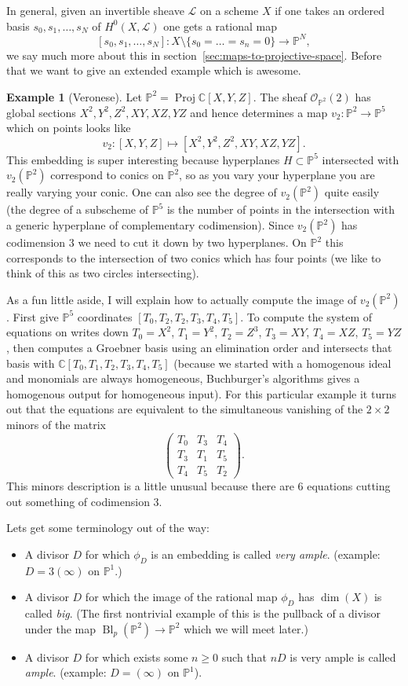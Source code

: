 \documentclass[12pt]{article}
\numberwithin{equation}{section}
\theoremstyle{definition}
\newtheorem{example}[theorem]{Example}
\theoremstyle{remark}
\newcommand{\CC}{\mathbb{C}}
\newcommand{\Ocal}{\mathcal{O}}
\newcommand{\PP}{\mathbb{P}}
\newcommand{\Proj}{\operatorname{Proj}}
\newcommand{\Bl}{\operatorname{Bl}}
\newcommand{\Lcal}{\mathcal{L}}
\begin{document}
In general, given an invertible sheave $\Lcal$ on a scheme $X$ if one takes an ordered basis $s_0,s_1,\ldots,s_N$ of $H^0(X,\Lcal)$ one gets a rational map
$$ [s_0,s_1,\ldots,s_N]: X\setminus \lbrace s_0=\ldots =s_n=0 \rbrace \to \PP^N,$$
we say much more about this in section~\ref{sec:maps-to-projective-space}.
Before that we want to give an extended example which is awesome.
\begin{example}[Veronese]
	Let $\PP^2 = \Proj \CC[X,Y,Z]$.
	The sheaf $\Ocal_{\PP^2}(2)$ has global sections $X^2,Y^2,Z^2,XY,XZ,YZ$ and hence determines a map $v_2: \PP^2 \to \PP^5$ which on points looks like
	 $$v_2: [X,Y,Z] \mapsto [X^2,Y^2,Z^2,XY,XZ,YZ].$$  
	This embedding is super interesting because hyperplanes $H \subset \PP^5$ intersected with $v_2(\PP^2)$ correspond to conics on $\PP^2$, so as you vary your hyperplane you are really varying your conic. 
	One can also see the degree of $v_2(\PP^2)$ quite easily (the degree of a subscheme of $\PP^5$ is the number of points in the intersection with a generic hyperplane of complementary codimension). 
	Since $v_2(\PP^2)$ has codimension $3$ we need to cut it down by two hyperplanes. 
	On $\PP^2$ this corresponds to the intersection of two conics which has four points (we like to think of this as two circles intersecting). 
	 
	 As a fun little aside, I will explain how to actually compute the image of $v_2(\PP^2)$. 
	 First give $\PP^5$ coordinates $[T_0,T_2,T_2,T_3,T_4,T_5]$. 
	 To compute the system of equations on writes down $T_0 = X^2$, $T_1=Y^2$, $T_2=Z^3$, $T_3=XY$, $T_4=XZ$, $T_5=YZ$, then computes a Groebner basis using an elimination order and intersects that basis with $\CC[T_0,T_1,T_2,T_3,T_4,T_5]$ (because we started with a homogenous ideal and monomials are always homogeneous, Buchburger's  algorithms gives a homogenous output for homogeneous input).
	 For this particular example it turns out that  the equations are equivalent to the simultaneous vanishing of the $2\times 2$ minors of the matrix
	 $$\begin{pmatrix}
	 T_0 & T_3 & T_4\\
	 T_3  & T_1 & T_5 \\
	 T_4  & T_5 & T_2
	 \end{pmatrix}.$$
	 This minors description is a little unusual because there are 6 equations cutting out something of codimension 3.
\end{example}

Lets get some terminology out of the way:
	\begin{itemize}
		\item A divisor $D$ for which $\phi_D$ is an embedding is called \emph{very ample}. (example: $D=3(\infty)$ on $\PP^1$.)
		\item A divisor $D$ for which the image of the rational map $\phi_D$ has $\dim(X)$ is called \emph{big}. (The first nontrivial example of this is the pullback of a divisor under the map $\Bl_p(\PP^2) \to \PP^2$ which we will meet later.)
		\item A divisor $D$ for which exists some $n\geq 0$ such that $nD$ is very ample is called \emph{ample}. (example: $D=(\infty)$ on $\PP^1$).
	\end{itemize}
\end{document}
